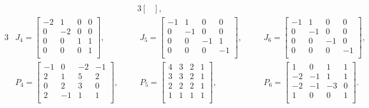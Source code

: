 \documentclass[12pt,twoside]{jarticle}
\begin{document}
{{\begin{alignat*}{3}
\begin{bmatrix}
  \end{bmatrix},
\end{alignat*}
\begin{alignat*}{3}
  &
  J_4 =
  \begin{bmatrix}
    -2 &  1 &  0 &  0 \\
     0 & -2 &  0 &  0 \\
     0 &  0 &  1 &  1 \\
     0 &  0 &  0 &  1 \\
  \end{bmatrix},
  & \quad &
  J_5 =
  \begin{bmatrix}
    -1 &  1 &  0 &  0 \\
     0 & -1 &  0 &  0 \\
     0 &  0 & -1 &  1 \\
     0 &  0 &  0 & -1 \\
  \end{bmatrix},
  & \quad &
  J_6 =
  \begin{bmatrix}
    -1 &  1 &  0 &  0 \\
     0 & -1 &  0 &  0 \\
     0 &  0 & -1 &  0 \\
     0 &  0 &  0 & -1 \\
  \end{bmatrix},
  \\ &
  P_4 =
  \begin{bmatrix}
    -1 &  0 & -2 & -1 \\
     2 &  1 &  5 &  2 \\
     0 &  2 &  3 &  0 \\
     2 & -1 &  1 &  1 \\
  \end{bmatrix},
  & \quad &
  P_5 =
  \begin{bmatrix}
    4 & 3 & 2 & 1 \\
    3 & 3 & 2 & 1 \\
    2 & 2 & 2 & 1 \\
    1 & 1 & 1 & 1 \\
  \end{bmatrix},
  & \quad &
  P_6 =
  \begin{bmatrix}
     1 &  0 &  1 &  1 \\
    -2 & -1 &  1 &  1 \\
    -2 & -1 & -3 &  0 \\
     1 &  0 &  0 &  1 \\
  \end{bmatrix}.
\end{alignat*}
}}
\end{document}

